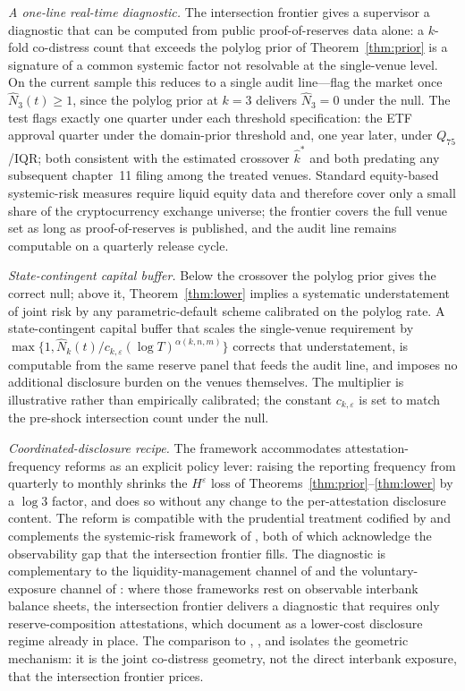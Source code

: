 \emph{A one-line real-time diagnostic.} The intersection frontier
gives a supervisor a diagnostic that can be computed from public
proof-of-reserves data alone: a $k$-fold co-distress count that
exceeds the polylog prior of Theorem~\ref{thm:prior} is a
signature of a common systemic factor not resolvable at the
single-venue level. On the current sample this reduces to a single
audit line---flag the market once $\hat N_3(t) \ge 1$, since the
polylog prior at $k = 3$ delivers $\hat N_3 = 0$ under the null.
The test flags exactly one quarter under each threshold
specification: the ETF approval quarter under the domain-prior
threshold and, one year later, under $Q_{75}$/IQR; both consistent
with the estimated crossover $\hat k^\ast$ and both predating any
subsequent chapter~11 filing among the treated venues. Standard
equity-based systemic-risk measures require liquid equity data and
therefore cover only a small share of the cryptocurrency exchange
universe; the frontier covers the full venue set as long as
proof-of-reserves is published, and the audit line remains
computable on a quarterly release cycle.

\emph{State-contingent capital buffer.} Below the crossover the
polylog prior gives the correct null; above it,
Theorem~\ref{thm:lower} implies a systematic understatement of
joint risk by any parametric-default scheme calibrated on the
polylog rate. A state-contingent capital buffer that scales the
single-venue requirement by
$\max\{1, \hat N_k(t) / c_{k,\varepsilon}(\log T)^{\alpha(k,n,m)}\}$
corrects that understatement, is computable from the same reserve
panel that feeds the audit line, and imposes no additional
disclosure burden on the venues themselves. The multiplier is
illustrative rather than empirically calibrated; the constant
$c_{k,\varepsilon}$ is set to match the pre-shock intersection
count under the null.

\emph{Coordinated-disclosure recipe.} The framework accommodates
attestation-frequency reforms as an explicit policy lever: raising
the reporting frequency from quarterly to monthly shrinks the
$H^\varepsilon$ loss of Theorems~\ref{thm:prior}--\ref{thm:lower}
by a $\log 3$ factor, and does so without any change to the
per-attestation disclosure content. The reform is compatible with
the prudential treatment codified by \citet{BCBS2021Crypto} and
complements the systemic-risk framework of \citet{FSB2023Crypto},
both of which acknowledge the observability gap that the
intersection frontier fills. The diagnostic is complementary to
the liquidity-management channel of \citet{BianchiBigio2022} and
the voluntary-exposure channel of \citet{Farboodi2023}: where
those frameworks rest on observable interbank balance sheets, the
intersection frontier delivers a diagnostic that requires only
reserve-composition attestations, which
\citet{Fahlenbrach-Kirchler-Kremer2024} document as a lower-cost
disclosure regime already in place. The comparison to
\citet{RochetTirole1996}, \citet{CabralesGaleGottardi2016}, and
\citet{Aramonte-Huang-Schrimpf2021} isolates the geometric
mechanism: it is the joint co-distress geometry, not the direct
interbank exposure, that the intersection frontier prices.


